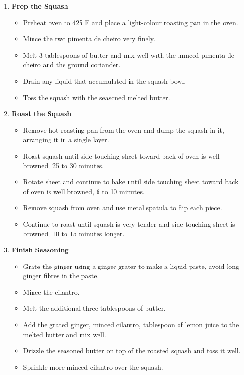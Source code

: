 \documentclass [11pt, letterpaper] {article}
\begin{document}
\begin{description}
\begin{enumerate}
	\item {\bf Prep the Squash}
	\begin{itemize}
	\item Preheat oven to 425 F and place a light-colour roasting pan in the oven.
	\item Mince the two pimenta de cheiro very finely.
	\item Melt 3 tablespoons of butter and mix well with the minced pimenta de cheiro and the ground coriander.
	\item Drain any liquid that accumulated in the squash bowl.
	\item Toss the squash with the seasoned melted butter.
	\end{itemize}
	
	\item {\bf Roast the Squash}
	\begin{itemize}	
	\item Remove hot roasting pan from the oven and dump the squash in it, arranging it in a single layer. 
	\item Roast squash until side touching sheet toward back of oven is well browned, 25 to 30 minutes. 
	\item Rotate sheet and continue to bake until side touching sheet toward back of oven is well browned, 6 to 10 minutes. 
	\item Remove squash from oven and use metal spatula to flip each piece. 
	\item Continue to roast until squash is very tender and side touching sheet is browned, 10 to 15 minutes longer.
	\end{itemize}
		
	\item {\bf Finish Seasoning}
	\begin{itemize}
	\item Grate the ginger using a ginger grater to make a liquid paste, avoid long ginger fibres in the paste.
	\item Mince the cilantro.
	\item Melt the additional three tablespoons of butter.
	\item Add the grated ginger, minced cilantro, tablespoon of lemon juice to the melted butter and mix well.
	\item Drizzle the seasoned butter on top of the roasted squash and toss it well.
	\item Sprinkle more minced cilantro over the squash.
	\end{itemize}
	\end{enumerate}
\end{description}
\end{document}
